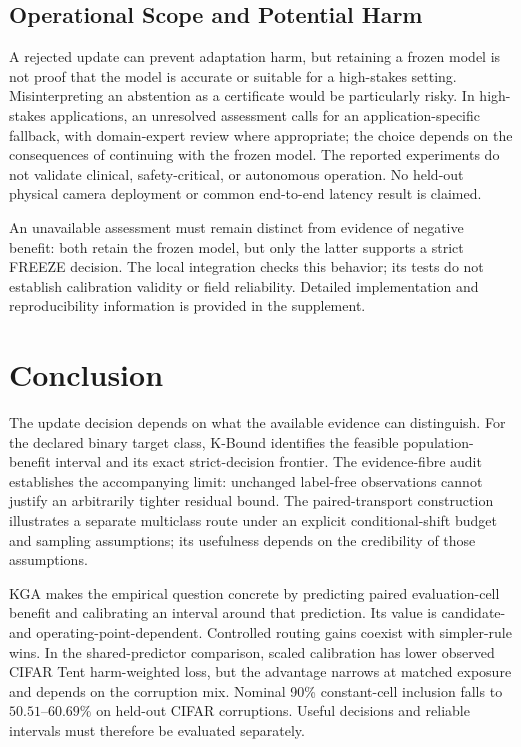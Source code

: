 \subsection{Operational Scope and Potential Harm}

A rejected update can prevent adaptation harm, but retaining a frozen model is not proof that the
model is accurate or suitable for a high-stakes setting. Misinterpreting an abstention as a
certificate would be particularly risky. In high-stakes applications, an unresolved assessment
calls for an application-specific fallback, with domain-expert review where appropriate;
the choice depends on the consequences of continuing with the frozen model.
The reported experiments do not validate clinical, safety-critical, or autonomous operation.
No held-out physical camera deployment or common end-to-end latency result is claimed.

An unavailable assessment must remain distinct from evidence of negative benefit: both retain
the frozen model, but only the latter supports a strict FREEZE decision. The local integration
checks this behavior; its tests do not establish calibration validity or field reliability.
Detailed implementation and reproducibility information is provided in the supplement.

\section{Conclusion}
\label{sec:compact-conclusion}

The update decision depends on what the available evidence can distinguish. For the declared
binary target class, K-Bound identifies the feasible population-benefit interval and its exact
strict-decision frontier. The evidence-fibre audit establishes the accompanying limit: unchanged
label-free observations cannot justify an arbitrarily tighter residual bound. The paired-transport
construction illustrates a separate multiclass route under an explicit conditional-shift budget
and sampling assumptions; its usefulness depends on the credibility of those assumptions.

KGA makes the empirical question concrete by predicting paired evaluation-cell benefit and
calibrating an interval around that prediction. Its value is candidate- and operating-point-dependent.
Controlled routing gains coexist with simpler-rule wins. In the shared-predictor comparison,
scaled calibration has lower observed CIFAR Tent harm-weighted loss, but the advantage narrows at matched
exposure and depends on the corruption mix. Nominal 90\% constant-cell inclusion falls to $50.51$--$60.69\%$ on held-out CIFAR
corruptions. Useful decisions and reliable intervals must therefore be evaluated separately.

